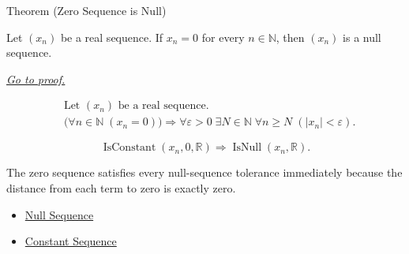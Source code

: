 
\begin{theorembox}{Theorem (Zero Sequence is Null)}
\begin{theorem}
\label{thm:zero-sequence-is-null}
Let $(x_n)$ be a real sequence. If $x_n = 0$ for every $n \in \mathbb{N}$,
then $(x_n)$ is a null sequence.

\smallskip
\noindent
\hyperref[prf:zero-sequence-is-null]{\textit{Go to proof.}}
\end{theorem}
\end{theorembox}

\begin{remark*}
\[
\begin{aligned}
&\text{Let } (x_n) \text{ be a real sequence.}\\
&\bigl(\forall n \in \mathbb{N}\;(x_n = 0)\bigr)
\Longrightarrow
\forall \varepsilon > 0\;
\exists N \in \mathbb{N}\;
\forall n \ge N\;(|x_n| < \varepsilon).
\end{aligned}
\]
\end{remark*}

\begin{remark*}
\[
\operatorname{IsConstant}(x_n,0,\mathbb{R})
\Longrightarrow
\operatorname{IsNull}(x_n,\mathbb{R}).
\]
\end{remark*}

\begin{remark*}[Interpretation]
The zero sequence satisfies every null-sequence tolerance immediately because
the distance from each term to zero is exactly zero.
\end{remark*}

\begin{dependencies}
\begin{itemize}
  \item \hyperref[def:null-sequence]{Null Sequence}
  \item \hyperref[def:constant-sequence]{Constant Sequence}
\end{itemize}
\end{dependencies}


